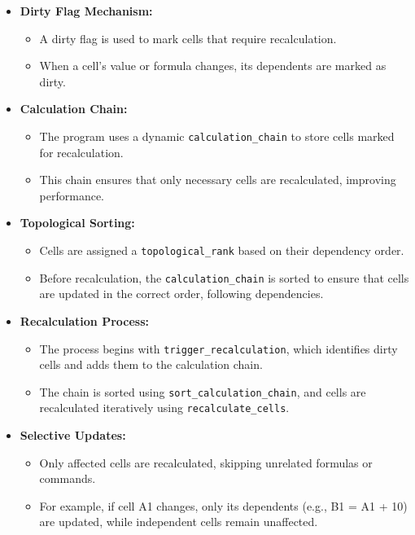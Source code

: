\documentclass{article}
\begin{document}
\begin{itemize}
    \item \textbf{Dirty Flag Mechanism:}
    
    \begin{itemize}
        \item A dirty flag is used to mark cells that require recalculation.
        \item When a cell's value or formula changes, its dependents are marked as dirty.
    \end{itemize}
    
    \item \textbf{Calculation Chain:}
    
    \begin{itemize}
        \item The program uses a dynamic \texttt{calculation\_chain} to store cells marked for recalculation.
        \item This chain ensures that only necessary cells are recalculated, improving performance.
    \end{itemize}
    
    \item \textbf{Topological Sorting:}
    
    \begin{itemize}
        \item Cells are assigned a \texttt{topological\_rank} based on their dependency order.
        \item Before recalculation, the \texttt{calculation\_chain} is sorted to ensure that cells are updated in the correct order, following dependencies.
    \end{itemize}
    
    \item \textbf{Recalculation Process:}
    
    \begin{itemize}
        \item The process begins with \texttt{trigger\_recalculation}, which identifies dirty cells and adds them to the calculation chain.
        \item The chain is sorted using \texttt{sort\_calculation\_chain}, and cells are recalculated iteratively using \texttt{recalculate\_cells}.
    \end{itemize}
    
    \item \textbf{Selective Updates:}
    
    \begin{itemize}
        \item Only affected cells are recalculated, skipping unrelated formulas or commands.
        \item For example, if cell A1 changes, only its dependents (e.g., B1 = A1 + 10) are updated, while independent cells remain unaffected.
    \end{itemize}
\end{itemize}
\end{document}
